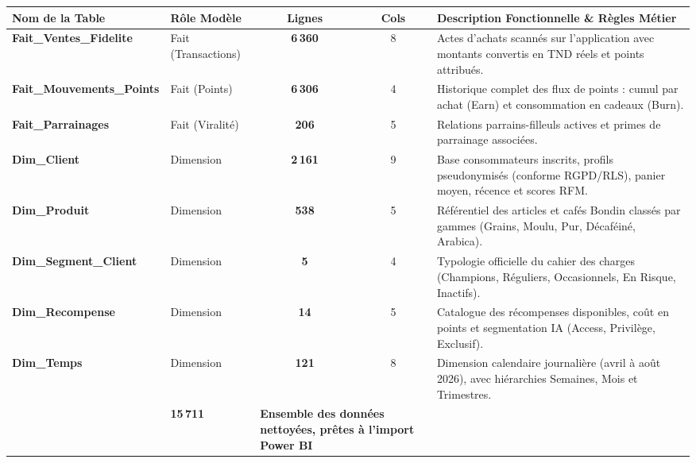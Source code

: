 \documentclass[11pt,a4paper]{article}
\begin{document}
\vspace{0.2cm}
\noindent
\begin{tabularx}{\textwidth}{>{\bfseries\ttfamily}p{4.4cm} p{2.6cm} c c X}
\toprule
\rowcolor{tableheader}
\textnormal{\textbf{Nom de la Table}} & \textbf{Rôle Modèle} & \textbf{Lignes} & \textbf{Cols} & \textbf{Description Fonctionnelle \& Règles Métier} \\
\midrule
Fait\_Ventes\_Fidelite & Fait (Transactions) & \textbf{6\,360} & 8 & Actes d'achats scannés sur l'application avec montants convertis en TND réels et points attribués. \\
Fait\_Mouvements\_Points & Fait (Points) & \textbf{6\,306} & 4 & Historique complet des flux de points : cumul par achat (Earn) et consommation en cadeaux (Burn). \\
Fait\_Parrainages & Fait (Viralité) & \textbf{206} & 5 & Relations parrains-filleuls actives et primes de parrainage associées. \\
\midrule
Dim\_Client & Dimension & \textbf{2\,161} & 9 & Base consommateurs inscrits, profils pseudonymisés (conforme RGPD/RLS), panier moyen, récence et scores RFM. \\
Dim\_Produit & Dimension & \textbf{538} & 5 & Référentiel des articles et cafés Bondin classés par gammes (Grains, Moulu, Pur, Décaféiné, Arabica). \\
Dim\_Segment\_Client & Dimension & \textbf{5} & 4 & Typologie officielle du cahier des charges (Champions, Réguliers, Occasionnels, En Risque, Inactifs). \\
Dim\_Recompense & Dimension & \textbf{14} & 5 & Catalogue des récompenses disponibles, coût en points et segmentation IA (Access, Privilège, Exclusif). \\
Dim\_Temps & Dimension & \textbf{121} & 8 & Dimension calendaire journalière (avril à août 2026), avec hiérarchies Semaines, Mois et Trimestres. \\
\midrule
\rowcolor{lightgray}
\multicolumn{2}{l}{\textbf{TOTAL DATA WAREHOUSE}} & \textbf{15\,711} & \multicolumn{2}{l}{\textbf{Ensemble des données nettoyées, prêtes à l'import Power BI}} \\
\bottomrule
\end{tabularx}

\vspace{0.4cm}

\end{document}
